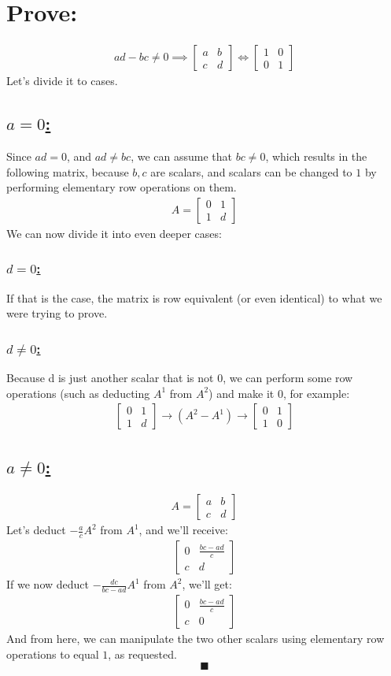 \documentclass[a4paper, 12pt]{article}
\newcommand{\sub}[1]{\subsection{\underline{#1}}}
\newcommand{\subsub}[1]{\subsubsection{\underline{#1}}}
\newcommand{\?}{\stackrel{?}{=}}
\newcommand{\eq}[1]{\begin{align*}#1\end{align*}}
\renewcommand{\qed}{$$\blacksquare$$}
\begin{document}
\section{Prove:}
\eq{
    ad-bc\neq{0} \implies
    \begin{bmatrix}
        a&b\\
        c&d
    \end{bmatrix}
    \iff
    \begin{bmatrix}
        1&0\\
        0&1
    \end{bmatrix}
}
Let's divide it to cases.
\sub{$a=0$:}
Since $ad=0$, and $ad\neq{bc}$, we can assume that $bc\neq{0}$, which results in the following matrix, because $b,c$ are scalars,
and scalars can be changed to $1$ by performing elementary row operations on them.
\eq{A=\begin{bmatrix}
    0&1\\
    1&d
\end{bmatrix}}
We can now divide it into even deeper cases:
\subsub{$d=0$:}
If that is the case, the matrix is row equivalent (or even identical) to what we were trying to prove.
\subsub{$d\neq{0}$:}
Because d is just another scalar that is not $0$, we can perform some row operations (such as deducting $A^1$ from $A^2$) and make it $0$, for example:
\eq{
    \begin{bmatrix}
        0&1\\
        1&d
    \end{bmatrix}
    \longrightarrow(A^2-A^1)\longrightarrow
    \begin{bmatrix}
        0&1\\
        1&0
    \end{bmatrix}
}
\sub{$a\neq{0}$:}
\eq{A=\begin{bmatrix}
    a&b\\
    c&d
\end{bmatrix}}
Let's deduct $-\frac{a}{c}A^2$ from $A^1$, and we'll receive:
\eq{\begin{bmatrix}
    0&\frac{bc-ad}{c}\\
    c&d
\end{bmatrix}}
If we now deduct $-\frac{dc}{bc-ad}A^1$ from $A^2$, we'll get:
\eq{\begin{bmatrix}
    0&\frac{bc-ad}{c}\\
    c&0
\end{bmatrix}}
And from here, we can manipulate the two other scalars using elementary row operations to equal $1$, as requested.
\qed


\end{document}
